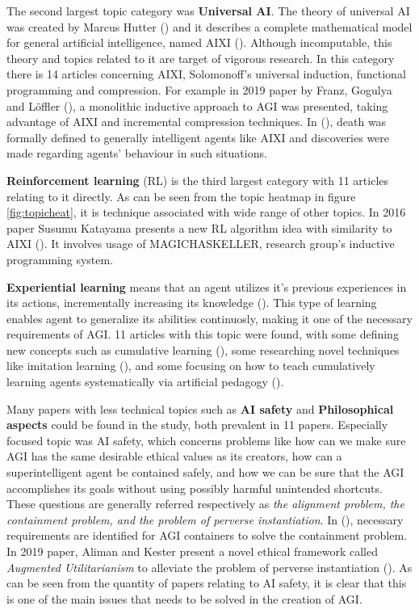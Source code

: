 \documentclass[utf8,english]{gradu3}
\begin{document}
The second largest topic category was \textbf{Universal AI}. The theory of
universal AI was created by Marcus Hutter (\cite*{hutter2004}) and it describes
a complete mathematical model for general artificial intelligence, named AIXI
(\cite{hutter2012decade}). Although incomputable, this theory and topics related
to it are target of vigorous research. In this category there is 14 articles
concerning AIXI, Solomonoff's universal induction, functional programming and
compression. For example in 2019 paper by Franz, Gogulya and Löffler
(\cite*{franz2019william}), a monolithic inductive approach to AGI was
presented, taking advantage of AIXI and incremental compression techniques. In
(\cite{martin2016death}), death was formally defined to generally intelligent
agents like AIXI and discoveries were made regarding agents' behaviour in such
situations.

\textbf{Reinforcement learning} (RL) is the third largest category with 11
articles relating to it directly. As can be seen from the topic heatmap in
figure \ref{fig:topicheat}, it is technique associated with wide range of other
topics. In 2016 paper Susumu Katayama presents a new RL algorithm idea with
similarity to AIXI (\cite{katayama2016ideas}). It involves usage of
MAGICHASKELLER, research group's inductive programming system.

\textbf{Experiential learning} means that an agent utilizes it's previous
experiences in its actions, incrementally increasing its knowledge
(\cite{thorisson2019cumulative}). This type of learning enables agent to
generalize its abilities continuosly, making it one of the necessary
requirements of AGI. 11 articles with this topic were found, with some defining
new concepts such as cumulative learning (\cite{thorisson2019cumulative}), some
researching novel techniques like imitation learning (\cite{katz2016imitation}),
and some focusing on how to teach cumulatively learning agents systematically
via artificial pedagogy (\cite{bieger2017pentagon}).


Many papers with less technical topics such as \textbf{AI safety} and
\textbf{Philosophical aspects} could be found in the study, both prevalent in 11
papers. Especially focused topic was AI safety, which concerns problems like how
can we make sure AGI has the same desirable ethical values as its creators, how
can a superintelligent agent be contained safely, and how we can be sure that
the AGI accomplishes its goals without using possibly harmful unintended
shortcuts. These questions are generally referred respectively as \emph{the
alignment problem, the containment problem, and the problem of perverse
instantiation}. In (\cite{babcock2016containment}), necessary requirements are
identified for AGI containers to solve the containment problem. In 2019 paper,
Aliman and Kester present a novel ethical framework called \emph{Augmented
Utilitarianism} to alleviate the problem of perverse instantiation
(\cite{aliman2019augmented}). As can be seen from the quantity of papers
relating to AI safety, it is clear that this is one of the main issues that
needs to be solved in the creation of AGI.
\end{document}
